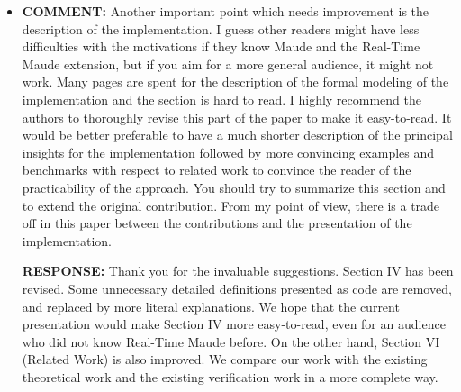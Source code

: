 \documentclass[10pt,journal]{IEEEtran}
\newcommand{\ANSWER}{{\bf RESPONSE: }}
\newcommand{\COMMENT}{{\bf COMMENT: }}
\begin{document}
\begin{itemize}
\ANSWER We are happy that the readers are interested in the detailed
technical proof, and we have now included it in the Appendix. It is
true that readers may be interested in the detailed proof of Theorem~2
to feel convinced of the completeness of our approach. However, the
proof needs a bit more theoretical background about rewriting logic
and more technical details of our model, which we have simplified in
the paper in order to ease the understanding of our approach. We would
prefer to refer the detailed proof to a non-anonymous technical
report, if possible, in the final version.

\item
\COMMENT Another important point which needs improvement is the
description of the implementation. I guess other readers might have
less difficulties with the motivations if they know Maude and the
Real-Time Maude extension, but if you aim for a more general audience,
it might not work. Many pages are spent for the description of the
formal modeling of the implementation and the section is hard to
read. I highly recommend the authors to thoroughly revise this part of
the paper to make it easy-to-read. It would be better preferable to
have a much shorter description of the principal insights for the
implementation followed by more convincing examples and benchmarks
with respect to related work to convince the reader of the
practicability of the approach. You should try to summarize this
section and to extend the original contribution. From my point of
view, there is a trade off in this paper between the contributions and
the presentation of the implementation.

\ANSWER Thank you for the invaluable suggestions. Section IV has been
revised. Some unnecessary detailed definitions presented as code are
removed, and replaced by more literal explanations. We hope that the
current presentation would make Section IV more easy-to-read, even for
an audience who did not know Real-Time Maude before. On the other
hand, Section VI (Related Work) is also improved. We compare our work
with the existing theoretical work and the existing verification work
in a more complete way.

\end{itemize}
\end{document}
